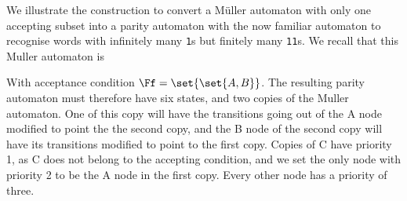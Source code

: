 \begin{example}
    We illustrate the construction to convert a Müller automaton
    with only one accepting subset into a parity automaton
    with the now familiar automaton to recognise words with infinitely many \texttt{1}s
    but finitely many \texttt{11}s.
    We recall that this Muller automaton is
    \begin{center}
    \end{center}
    With acceptance condition $\Ff = \set{\set{A, B}}$. The resulting parity automaton
    must therefore have six states, and two copies of the Muller automaton.
    One of this copy will have the transitions going out of the A node modified
    to point the the second copy, and the B node of the second copy will have its transitions
    modified to point to the first copy. Copies of C have priority 1, as C does not belong to
    the accepting condition, and we set the only node with priority 2 to be the A node in the
    first copy. Every other node has a priority of three.

    \begin{center}
\end{center}
\end{example}
